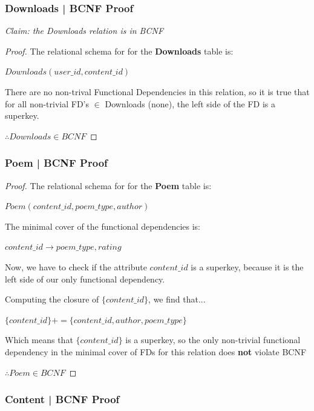 \documentclass[letter, 12pt, titlepage]{article}
\begin{document}
\subsubsection{Downloads | BCNF Proof }


\textit{Claim: the Downloads relation is in BCNF}


\begin{proof}

	The relational schema for for the \textbf{Downloads} table is:

	$Downloads(user\_id, content\_id)$

	There are no non-trival Functional Dependencies in this relation, so it is true that for all non-trivial FD's $\in$ Downloads (none), the left side of the FD is a superkey.

	$\therefore Downloads \in BCNF $

\end{proof}

\subsubsection{Poem | BCNF Proof }

\begin{proof}


	The relational schema for for the \textbf{Poem} table is:


	$Poem(content\_id, poem\_type, author)$


	The minimal cover of the functional dependencies is:


	$ content\_id \rightarrow poem\_type, rating $


	Now, we have to check if the attribute $content\_id$ is a superkey, because it is the left side of our only functional dependency.


	Computing the closure of $\{content\_id\}$, we find that...

	$\{content\_id\}+ = \{content\_id, author, poem\_type \} $

	Which means that $\{content\_id\}$ is a superkey, so the only non-trivial functional dependency in the minimal cover of FDs for this relation does \textbf{not} violate BCNF

	$\therefore Poem \in BCNF $
\end{proof}

\subsubsection{Content | BCNF Proof }
\end{document}
